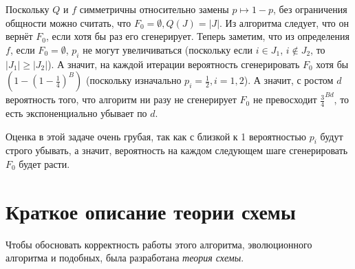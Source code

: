 \begin{solution}
    Поскольку $Q$ и $f$ симметричны относительно замены $p \mapsto 1-p$, без ограничения общности можно считать, что $F_0 = \emptyset, Q(J) = |J|$. Из алгоритма следует, что он вернёт $F_0$, если хотя бы раз его сгенерирует. Теперь заметим, что из определения $f$, если $F_0 = \emptyset$, $p_i$ не могут увеличиваться (поскольку если $i \in J_1$, $i \notin J_2$, то $|J_1| \geqslant |J_2|$). А значит, на каждой итерации вероятность сгенерировать $F_0$ хотя бы $\left(1- \left(1 - \frac{1}{4}\right)^B\right)$ (поскольку изначально $p_i = \frac{1}{2}, i = 1,2$). А значит, с ростом $d$ вероятность того, что алгоритм ни разу не сгенерирует $F_0$ не превосходит $\frac{3}{4}^{Bd}$, то есть экспоненциально убывает по $d$.
\end{solution}
\begin{remark}
    Оценка в этой задаче очень грубая, так как с близкой к 1 вероятностью $p_i$ будут строго убывать, а значит, вероятность на каждом следующем шаге сгенерировать $F_0$ будет расти.
\end{remark}

\section*{Краткое описание теории схемы}
Чтобы обосновать корректность работы этого алгоритма, эволюционного алгоритма и подобных, была разработана \textit{теория схемы}.


